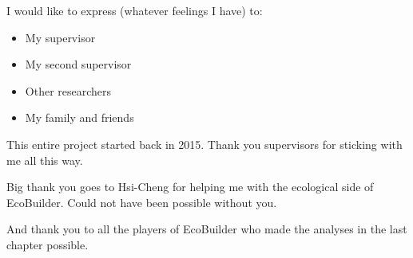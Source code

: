 \cleardoublepage


\begin{acknowledgements}

I would like to express (whatever feelings I have) to:

\begin{itemize}
 \item My supervisor
 \vspace*{3mm}
 \item My second supervisor
 \vspace*{3mm}
 \item Other researchers
 \vspace*{3mm}
 \item My family and friends
\end{itemize}

This entire project started back in 2015. Thank you supervisors for sticking with me all this way.

Big thank you goes to Hsi-Cheng for helping me with the ecological side of EcoBuilder. Could not have been possible without you.

And thank you to all the players of EcoBuilder who made the analyses in the last chapter possible.

\end{acknowledgements}